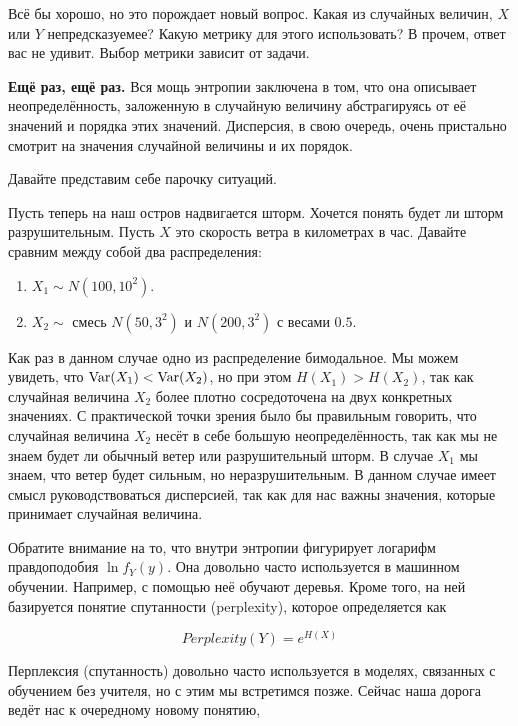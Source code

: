 \documentclass[12pt, a4paper, oneside]{article}
\begin{document}
Всё бы хорошо, но это порождает новый вопрос. Какая из случайных величин, $X$ или $Y$ непредсказуемее? Какую метрику для этого использовать? В прочем, ответ вас не удивит. Выбор метрики зависит от задачи. 

\textbf{Ещё раз, ещё раз.}  Вся мощь энтропии заключена в том, что она описывает неопределённость, заложенную в случайную величину абстрагируясь от её значений и порядка этих значений.  Дисперсия, в свою очередь, очень пристально смотрит на значения случайной величины и их порядок. 

Давайте представим себе парочку ситуаций. 


Пусть теперь на наш остров надвигается шторм. Хочется понять будет ли шторм разрушительным. Пусть $X$ это скорость ветра в километрах в час.   Давайте сравним между собой два распределения: 

\begin{enumerate}
\item $X_1 \sim N(100, 10^2)$. 
\item $X_2 \sim $  смесь $N(50, 3^2)$ и $N(200, 3^2)$ с весами $0.5$. 
\end{enumerate}

Как раз в данном случае одно из распределение бимодальное. Мы можем увидеть, что $\operatorname{Var}(X_1) <  \operatorname{Var}(X_2)$, но при этом $H(X_1) >  H(X_2)$, так как случайная величина $X_2$ более плотно сосредоточена на двух конкретных значениях.  С практической точки зрения было бы правильным говорить, что случайная величина $X_2$ несёт в себе большую неопределённость, так как  мы не знаем будет ли обычный ветер или разрушительный шторм. В случае $X_1$ мы знаем, что ветер будет сильным, но неразрушительным. В данном случае имеет смысл руководствоваться дисперсией, так как для нас важны значения, которые принимает случайная величина. 

Обратите внимание на то, что внутри энтропии фигурирует логарифм правдоподобия $\ln f_Y(y)$. Она довольно часто используется в машинном обучении. Например, с помощью неё обучают деревья.  Кроме того, на ней базируется понятие спутанности (perplexity), которое определяется как 

\[ Perplexity(Y) = e^{H(X)}\]

Перплексия (спутанность) довольно часто используется в моделях, связанных с обучением без учителя, но с этим мы встретимся позже. Сейчас наша дорога ведёт нас к очередному новому понятию, 
\end{document}
